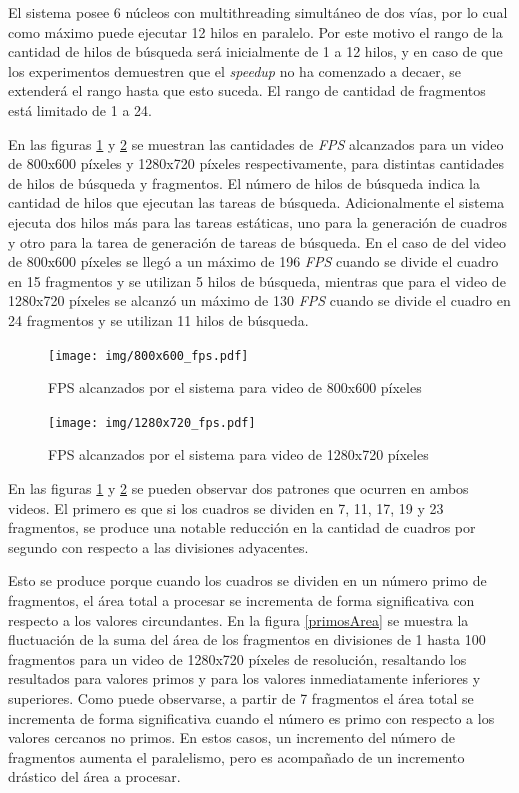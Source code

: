 El sistema posee 6 núcleos con multithreading simultáneo de dos vías, por lo
cual como máximo puede ejecutar 12 hilos en paralelo. Por este motivo el rango
de la cantidad de hilos de búsqueda será inicialmente de 1 a 12 hilos, y en caso
de que los experimentos demuestren que el \emph{speedup} no ha comenzado a
decaer, se extenderá el rango hasta que esto suceda. El rango de cantidad de
fragmentos está limitado de 1 a 24.

En las figuras \ref{800fps} y \ref{1280fps} se muestran las cantidades de
\emph{FPS} alcanzados para un video de 800x600 píxeles y 1280x720 píxeles
respectivamente, para distintas cantidades de hilos de búsqueda y fragmentos.
El número de hilos de búsqueda indica la cantidad de hilos que ejecutan las
tareas de búsqueda. Adicionalmente el sistema ejecuta dos hilos más para las
tareas estáticas, uno para la generación de cuadros y otro para la tarea de
generación de tareas de búsqueda. En el caso de del video de 800x600 píxeles se
llegó a un máximo de 196 \emph{FPS} cuando se divide el cuadro en 15 fragmentos
y se utilizan 5 hilos de búsqueda, mientras que para el video de 1280x720
píxeles se alcanzó un máximo de 130 \emph{FPS} cuando se divide el cuadro en 24
fragmentos y se utilizan 11 hilos de búsqueda.

\begin{figure}[!htb]

	\texttt{[image: img/800x600\_fps.pdf]}
	\caption{FPS alcanzados por el sistema para video de 800x600 píxeles}
	\label{800fps}

\end{figure}

\begin{figure}[!htb]

	\texttt{[image: img/1280x720\_fps.pdf]}
	\caption{FPS alcanzados por el sistema para video de 1280x720 píxeles}
	\label{1280fps}

\end{figure}

En las figuras \ref{800fps} y \ref{1280fps} se pueden observar dos patrones que
ocurren en ambos videos. El primero es que si los cuadros se dividen en 7, 11,
17, 19 y 23 fragmentos, se produce una notable reducción en la cantidad de
cuadros por segundo con respecto a las divisiones adyacentes.

Esto se produce porque cuando los cuadros se dividen en un número primo de
fragmentos, el área total a procesar se incrementa de forma significativa con
respecto a los valores circundantes. En la figura \ref{primosArea} se muestra la
fluctuación de la suma del área de los fragmentos en divisiones de 1 hasta 100
fragmentos para un video de 1280x720 píxeles de resolución, resaltando los
resultados para valores primos y para los valores inmediatamente inferiores y
superiores. Como puede observarse, a partir de 7 fragmentos el área total se
incrementa de forma significativa cuando el número es primo con respecto a los
valores cercanos no primos. En estos casos, un incremento del número de
fragmentos aumenta el paralelismo, pero es acompañado de un incremento drástico
del área a procesar.

